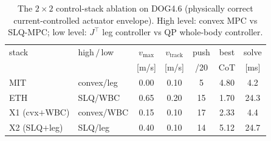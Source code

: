 \begin{table}[t]\centering
\caption{The $2\times2$ control-stack ablation on DOG4.6 (physically correct
current-controlled actuator envelope). High level: convex MPC vs SLQ-MPC;
low level: $J^\top$ leg controller vs QP whole-body controller.}
\label{tab:ablation_4p6}
\begin{tabular}{llccccc}
\toprule
stack & high$\,/\,$low & $v_\mathrm{max}$ & $v_\mathrm{track}$ & push & best & solve \\
 & & [m/s] & [m/s] & /20 & CoT & [ms] \\
\midrule
MIT & convex/leg & 0.00 & 0.10 & 5 & 4.80 & 4.2 \\
ETH & SLQ/WBC & 0.65 & 0.20 & 15 & 1.70 & 24.3 \\
X1 (cvx$+$WBC) & convex/WBC & 0.15 & 0.10 & 17 & 2.33 & 4.4 \\
X2 (SLQ$+$leg) & SLQ/leg & 0.40 & 0.10 & 14 & 5.12 & 24.7 \\
\bottomrule
\end{tabular}
\end{table}
